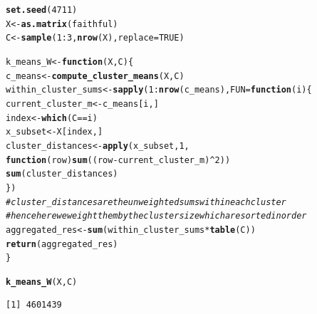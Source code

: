 \documentclass[10pt, a4paper, english]{article}\usepackage[]{graphicx}\usepackage[dvipsnames]{xcolor}
\makeatletter
\newcommand{\hlnum}[1]{\textcolor[rgb]{0.686,0.059,0.569}{#1}}%
\newcommand{\hlcom}[1]{\textcolor[rgb]{0.678,0.584,0.686}{\textit{#1}}}%
\newcommand{\hlopt}[1]{\textcolor[rgb]{0,0,0}{#1}}%
\newcommand{\hlstd}[1]{\textcolor[rgb]{0.345,0.345,0.345}{#1}}%
\newcommand{\hlkwa}[1]{\textcolor[rgb]{0.161,0.373,0.58}{\textbf{#1}}}%
\newcommand{\hlkwb}[1]{\textcolor[rgb]{0.69,0.353,0.396}{#1}}%
\newcommand{\hlkwc}[1]{\textcolor[rgb]{0.333,0.667,0.333}{#1}}%
\newcommand{\hlkwd}[1]{\textcolor[rgb]{0.737,0.353,0.396}{\textbf{#1}}}%
\newenvironment{kframe}{%
 \def\at@end@of@kframe{}%
 \ifinner\ifhmode%
  \def\at@end@of@kframe{\end{minipage}}%
  \begin{minipage}{\columnwidth}%
 \fi\fi%
 \def\FrameCommand##1{\hskip\@totalleftmargin \hskip-\fboxsep
 \colorbox{shadecolor}{##1}\hskip-\fboxsep
     \hskip-\linewidth \hskip-\@totalleftmargin \hskip\columnwidth}%
 \MakeFramed {\advance\hsize-\width
   \@totalleftmargin\z@ \linewidth\hsize
   \@setminipage}}%
 {\par\unskip\endMakeFramed%
 \at@end@of@kframe}
\newenvironment{knitrout}{}{} %
\makeatother
\begin{document}
\begin{knitrout}
\color{fgcolor}\begin{kframe}
\begin{alltt}
\hlkwd{set.seed}\hlstd{(}\hlnum{4711}\hlstd{)}
\hlstd{X} \hlkwb{<-} \hlkwd{as.matrix}\hlstd{(faithful)}
\hlstd{C} \hlkwb{<-} \hlkwd{sample}\hlstd{(}\hlnum{1}\hlopt{:} \hlnum{3}\hlstd{,} \hlkwd{nrow}\hlstd{(X),} \hlkwc{replace} \hlstd{=} \hlnum{TRUE}\hlstd{)}

\hlstd{k_means_W} \hlkwb{<-} \hlkwa{function}\hlstd{(}\hlkwc{X}\hlstd{,}\hlkwc{C}\hlstd{)\{}
  \hlstd{c_means} \hlkwb{<-} \hlkwd{compute_cluster_means}\hlstd{(X,C)}
   \hlstd{within_cluster_sums}\hlkwb{<-} \hlkwd{sapply}\hlstd{(}\hlnum{1}\hlopt{:}\hlkwd{nrow}\hlstd{(c_means),} \hlkwc{FUN}\hlstd{=}\hlkwa{function}\hlstd{(}\hlkwc{i}\hlstd{)\{}
    \hlstd{current_cluster_m} \hlkwb{<-} \hlstd{c_means[i, ]}
    \hlstd{index} \hlkwb{<-} \hlkwd{which}\hlstd{(C} \hlopt{==} \hlstd{i)}
    \hlstd{x_subset} \hlkwb{<-} \hlstd{X[index,]}
     \hlstd{cluster_distances} \hlkwb{<-} \hlkwd{apply}\hlstd{(x_subset,} \hlnum{1}\hlstd{,}
                                \hlkwa{function}\hlstd{(}\hlkwc{row}\hlstd{)} \hlkwd{sum}\hlstd{((row} \hlopt{-} \hlstd{current_cluster_m)}\hlopt{^}\hlnum{2}\hlstd{))}
     \hlkwd{sum}\hlstd{(cluster_distances)}
\hlstd{\})}
   \hlcom{#cluster_distances are the unweighted sums within each cluster}
   \hlcom{#hence here we weight them by the cluster size which are sorted in order}
   \hlstd{aggregated_res} \hlkwb{<-} \hlkwd{sum}\hlstd{(within_cluster_sums} \hlopt{*} \hlkwd{table}\hlstd{(C))}
   \hlkwd{return}\hlstd{(aggregated_res)}
\hlstd{\}}


\hlkwd{k_means_W}\hlstd{(X,C)}
\end{alltt}
\begin{verbatim}
[1] 4601439
\end{verbatim}
\end{kframe}
\end{knitrout}
\end{document}
